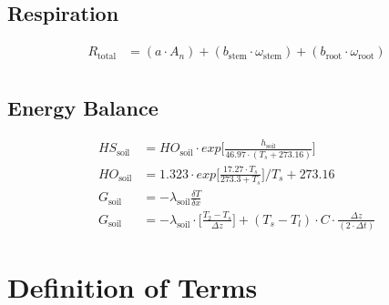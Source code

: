 \documentclass[12pt]{report}
\begin{document}
\subsection*{Respiration}
\begin{align}
 R_{\text{total}} &= (a \cdot A_n) + (b_{\text{stem}} \cdot \omega_{\text{stem}}) + (b_{\text{root}} \cdot \omega_{\text{root}}) \label{eqn:Rtotal} \\
\end{align}


\subsection*{Energy Balance}
\begin{align}
 HS_{\text{soil}} &= HO_{\text{soil}} \cdot exp\biggl[\frac{h_{\text{soil}}}{46.97 \cdot (T_s + 273.16)}\biggr] \label{eqn:HSsoil} \\
 HO_{\text{soil}} &= 1.323 \cdot exp\biggl[\frac{17.27 \cdot T_s}{273.3 + T_s}\biggr]\Bigg/ T_s + 273.16 \label{eqn:HOsoil} \\
 G_{\text{soil}} &= -\lambda_{\text{soil}} \frac{\delta T}{\delta x} \label{eqn:Gsoil} \\
 G_{\text{soil}} &= -\lambda_{\text{soil}} \cdot \biggl[\frac{T_2 - T_s}{\Delta z}\biggr] + (T_s - T_l) \cdot C \cdot \frac{\Delta z}{(2 \cdot \Delta t)} \label{eqn:Gsoil2}
\end{align}

\newpage

\section*{Definition of Terms } 
\end{document}

